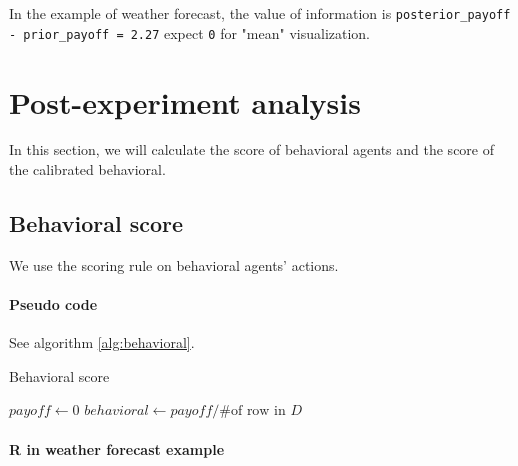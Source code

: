 \documentclass{article}
\begin{document}
In the example of weather forecast, the value of information is \texttt{posterior\_payoff - prior\_payoff = 2.27} expect \texttt{0} for "mean" visualization.

\section{Post-experiment analysis}

In this section, we will calculate the score of behavioral agents and the score of the calibrated behavioral.

\subsection{Behavioral score}

We use the scoring rule on behavioral agents' actions.

\paragraph{Pseudo code}
See algorithm \ref{alg:behavioral}.

\begin{algorithm}[!h]
\caption{Behavioral score}\label{alg:behavioral}
$payoff \gets 0$\;
$behavioral \gets payoff / \text{\# of row in }D$\;
\end{algorithm}

\paragraph{R in weather forecast example}
\end{document}
